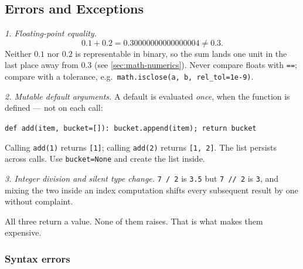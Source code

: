 \subsection{Errors and Exceptions}

\begin{workedexample}
\emph{1. Floating-point equality.}
\[
  0.1 + 0.2 = 0.30000000000000004 \neq 0.3 .
\]
Neither $0.1$ nor $0.2$ is representable in binary, so the sum lands one unit
in the last place away from $0.3$ (see \cref{sec:math-numerics}). Never compare
floats with \texttt{==}; compare with a tolerance, e.g.\
\texttt{math.isclose(a, b, rel\_tol=1e-9)}.

\emph{2. Mutable default arguments.} A default is evaluated \emph{once}, when
the function is defined --- not on each call:
\begin{center}
\texttt{def add(item, bucket=[]): bucket.append(item); return bucket}
\end{center}
Calling \texttt{add(1)} returns \texttt{[1]}; calling \texttt{add(2)}
returns \texttt{[1, 2]}. The list persists across calls. Use
\texttt{bucket=None} and create the list inside.

\emph{3. Integer division and silent type change.} \texttt{7 / 2} is
\texttt{3.5} but \texttt{7 // 2} is \texttt{3}, and mixing the two inside an
index computation shifts every subsequent result by one without complaint.

All three return a value. None of them raises. That is what makes them
expensive.
\end{workedexample}

\subsubsection{Syntax errors}

